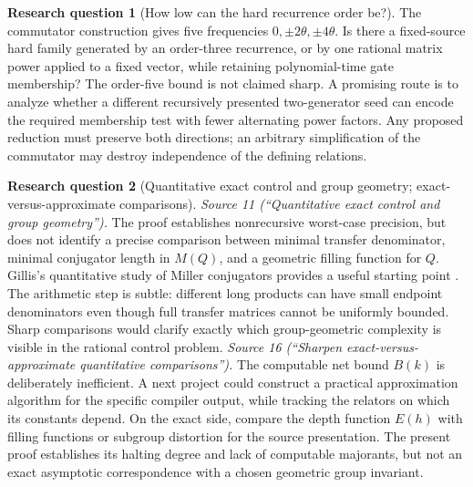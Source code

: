 \documentclass[11pt,letterpaper]{article}
\numberwithin{equation}{section}
\theoremstyle{definition}
\newtheorem{question}{Research question}
\theoremstyle{remark}
\begin{document}
\begin{question}[How low can the hard recurrence order be?]
\label{pqc:rr:q:order}
The commutator construction gives five frequencies
$0,\pm2\theta,\pm4\theta$. Is there a fixed-source hard family generated
by an order-three recurrence, or by one rational matrix power applied to
a fixed vector, while retaining polynomial-time gate membership?
The order-five bound is not claimed sharp. A promising route is to
analyze whether a different recursively presented two-generator seed
can encode the required membership test with fewer alternating power
factors. Any proposed reduction must preserve both directions; an
arbitrary simplification of the commutator may destroy independence of
the defining relations.
\end{question}

\begin{question}[Quantitative exact control and group geometry; exact-versus-approximate comparisons]
\label{pqc:rr:q:geometry}\label{pqc:dr:q:comparisons}
\emph{Source 11 (``Quantitative exact control and group geometry'').}
The proof establishes nonrecursive worst-case precision, but does not
identify a precise comparison between minimal transfer denominator,
minimal conjugator length in $M(Q)$, and a geometric filling function for
$Q$. Gillis's quantitative study of Miller conjugators provides a useful
starting point \cite{b62s11-Gillis}. The arithmetic step is subtle: different
long products can have small endpoint denominators even though full
transfer matrices cannot be uniformly bounded. Sharp comparisons would
clarify exactly which group-geometric complexity is visible in the
rational control problem.
\emph{Source 16 (``Sharpen exact-versus-approximate quantitative comparisons'').}
The computable net bound $B(k)$ is deliberately inefficient. A next
project could construct a practical approximation algorithm for the
specific compiler output, while tracking the relators on which its
constants depend. On the exact side, compare the depth function $E(h)$
with filling functions or subgroup distortion for the source presentation.
The present proof establishes its halting degree and lack of computable
majorants, but not an exact asymptotic correspondence with a chosen
geometric group invariant.
\end{question}
\end{document}
